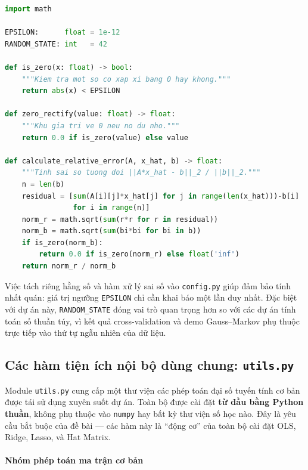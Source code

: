 \begin{lstlisting}[language=Python, caption={Module \texttt{config.py} --- hằng số và hàm xử lý sai số dùng chung}]
import math

EPSILON:      float = 1e-12
RANDOM_STATE: int   = 42

def is_zero(x: float) -> bool:
    """Kiem tra mot so co xap xi bang 0 hay khong."""
    return abs(x) < EPSILON

def zero_rectify(value: float) -> float:
    """Khu gia tri ve 0 neu no du nho."""
    return 0.0 if is_zero(value) else value

def calculate_relative_error(A, x_hat, b) -> float:
    """Tinh sai so tuong doi ||A*x_hat - b||_2 / ||b||_2."""
    n = len(b)
    residual = [sum(A[i][j]*x_hat[j] for j in range(len(x_hat)))-b[i]
                for i in range(n)]
    norm_r = math.sqrt(sum(r*r for r in residual))
    norm_b = math.sqrt(sum(bi*bi for bi in b))
    if is_zero(norm_b):
        return 0.0 if is_zero(norm_r) else float('inf')
    return norm_r / norm_b
\end{lstlisting}

Việc tách riêng hằng số và hàm xử lý sai số vào \texttt{config.py} giúp đảm bảo tính nhất quán: giá trị ngưỡng \texttt{EPSILON} chỉ cần khai báo một lần duy nhất. Đặc biệt với dự án này, \texttt{RANDOM\_STATE} đóng vai trò quan trọng hơn so với các dự án tính toán số thuần túy, vì kết quả cross-validation và demo Gauss--Markov phụ thuộc trực tiếp vào thứ tự ngẫu nhiên của dữ liệu.

\subsection{Các hàm tiện ích nội bộ dùng chung: \texttt{utils.py}}

Module \texttt{utils.py} cung cấp một thư viện các phép toán đại số tuyến tính cơ bản được tái sử dụng xuyên suốt dự án. Toàn bộ được cài đặt \textbf{từ đầu bằng Python thuần}, không phụ thuộc vào \texttt{numpy} hay bất kỳ thư viện số học nào. Đây là yêu cầu bắt buộc của đề bài --- các hàm này là ``động cơ'' của toàn bộ cài đặt OLS, Ridge, Lasso, và Hat Matrix.

\paragraph{Nhóm phép toán ma trận cơ bản}

